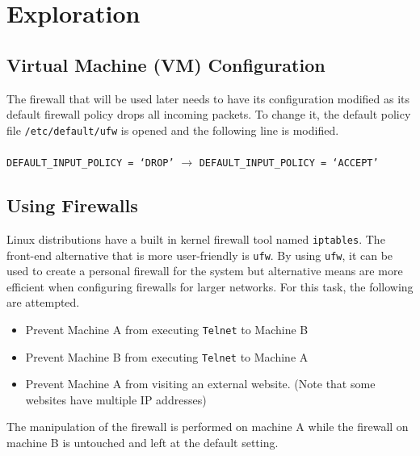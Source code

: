 \documentclass[a4paper,12pt]{article}
\begin{document}
\section{Exploration}
\subsection{Virtual Machine (VM) Configuration}
The firewall that will be used later needs to have its configuration modified as its default firewall policy drops all incoming packets. To change it, the default policy file \texttt{/etc/default/ufw} is opened and the following line is modified.\\\\
\texttt{DEFAULT\_INPUT\_POLICY = `DROP'} $\rightarrow$ \texttt{DEFAULT\_INPUT\_POLICY = `ACCEPT'}
\subsection{Using Firewalls}
Linux distributions have a built in kernel firewall tool named \texttt{iptables}. The front-end alternative that is more user-friendly is \texttt{ufw}. By using \texttt{ufw}, it can be used to create a personal firewall for the system but alternative means are more efficient when configuring firewalls for larger networks. For this task, the following are attempted.
\begin{itemize}
\item Prevent Machine A from executing \texttt{Telnet} to Machine B
\item Prevent Machine B from executing \texttt{Telnet} to Machine A
\item Prevent Machine A from visiting an external website. (Note that some websites have multiple IP addresses)
\end{itemize}
The manipulation of the firewall is performed on machine A while the firewall on machine B is untouched and left at the default setting.
\end{document}
